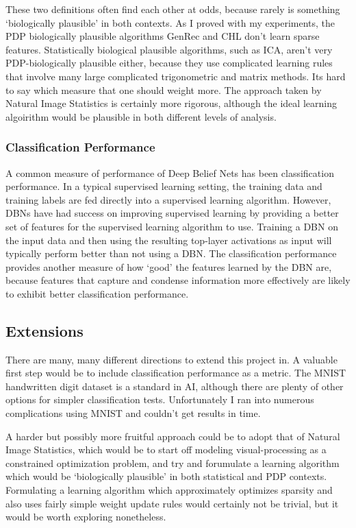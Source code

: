 \documentclass{article} %
\begin{document}
These two definitions often find each other at odds, because rarely is something `biologically plausible' in both contexts. As I proved with my experiments, the PDP biologically plausible algorithms GenRec and CHL don't learn sparse features. Statistically biological plausible algorithms, such as ICA, aren't very PDP-biologically plausible either, because they use complicated learning rules that involve many large complicated trigonometric and matrix methods. Its hard to say which measure that one should weight more. The approach taken by Natural Image Statistics is certainly more rigorous, although the ideal learning algoirithm would be plausible in both different levels of analysis.

\subsubsection{Classification Performance}

A common measure of performance of Deep Belief Nets has been classification performance. In a typical supervised learning setting, the training data and training labels are fed directly into a supervised learning algorithm. However, DBNs have had success on improving supervised learning by providing a better set of features for the supervised learning algorithm to use. Training a DBN on the input data and then using the resulting top-layer activations as input will typically perform better than not using a DBN. The classification performance provides another measure of how `good' the features learned by the DBN are, because features that capture and condense information more effectively are likely to exhibit better classification performance. 

\subsection{Extensions}
There are many, many different directions to extend this project in. A valuable first step would be to include classification performance as a metric. The MNIST handwritten digit dataset is a standard in AI, although there are plenty of other options for simpler classification tests. Unfortunately I ran into numerous complications using MNIST and couldn't get results in time. 

A harder but possibly more fruitful approach could be to adopt that of Natural Image Statistics, which would be to start off modeling visual-processing as a constrained optimization problem, and try and forumulate a learning algorithm which would be `biologically plausible' in both statistical and PDP contexts. Formulating a learning algorithm which approximately optimizes sparsity and also uses fairly simple weight update rules would certainly not be trivial, but it would be worth exploring nonetheless.
\end{document}
